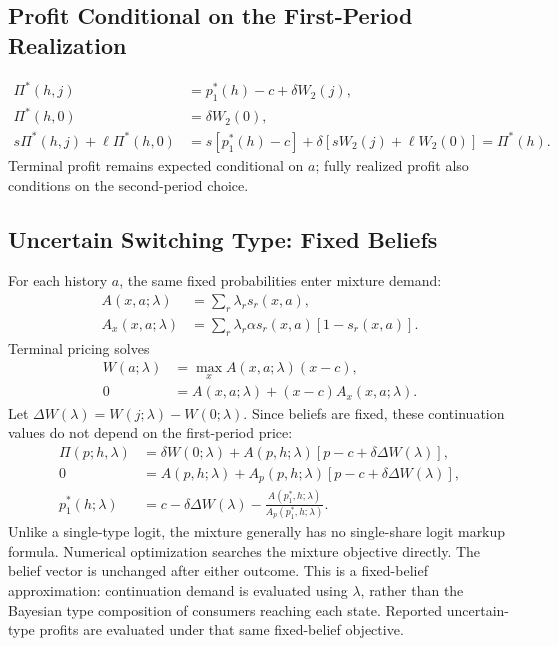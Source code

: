 \documentclass[12pt]{article}
\theoremstyle{definition}
\theoremstyle{remark}
\begin{document}
\subsection{Profit Conditional on the First-Period Realization}
\begin{align}
 \Pi^*(h,j)&=p_1^*(h)-c+\delta W_2(j),\\
 \Pi^*(h,0)&=\delta W_2(0),\\
 s\Pi^*(h,j)+\ell\Pi^*(h,0)
 &=s[p_1^*(h)-c]+\delta[sW_2(j)+\ell W_2(0)]
 =\Pi^*(h).
\end{align}
Terminal profit remains expected conditional on $a$; fully realized profit also
conditions on the second-period choice.

\subsection{Uncertain Switching Type: Fixed Beliefs}
\label{app:gamma-uncertainty}
For each history $a$, the same fixed probabilities enter mixture demand:
\begin{align}
 A(x,a;\lambda)&=\sum_r\lambda_rs_r(x,a),\\
 A_x(x,a;\lambda)&=\sum_r\lambda_r\alpha s_r(x,a)[1-s_r(x,a)].
\end{align}
Terminal pricing solves
\begin{align}
 W(a;\lambda)&=\max_x A(x,a;\lambda)(x-c),\\
 0&=A(x,a;\lambda)+(x-c)A_x(x,a;\lambda).
\end{align}
Let $\Delta W(\lambda)=W(j;\lambda)-W(0;\lambda)$. Since beliefs are fixed,
these continuation values do not depend on the first-period price:
\begin{align}
 \Pi(p;h,\lambda)
 &=\delta W(0;\lambda)
 +A(p,h;\lambda)[p-c+\delta\Delta W(\lambda)],\\
 0&=A(p,h;\lambda)
 +A_p(p,h;\lambda)[p-c+\delta\Delta W(\lambda)],\\
 p_1^*(h;\lambda)
 &=c-\delta\Delta W(\lambda)
 -\frac{A(p_1^*,h;\lambda)}{A_p(p_1^*,h;\lambda)}.
\end{align}
Unlike a single-type logit, the mixture generally has no single-share logit
markup formula. Numerical optimization searches the mixture objective directly.
The belief vector is unchanged after either outcome. This is a fixed-belief
approximation: continuation demand is evaluated using $\lambda$, rather than the
Bayesian type composition of consumers reaching each state. Reported uncertain-type
profits are evaluated under that same fixed-belief objective.
\end{document}
